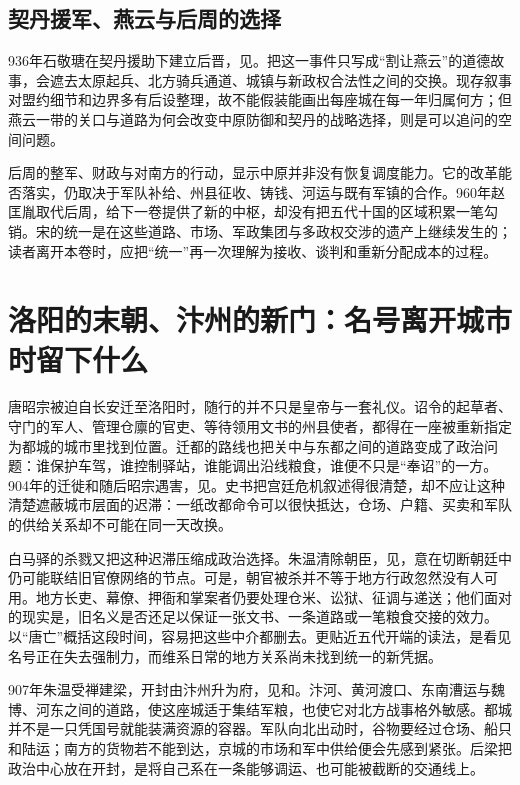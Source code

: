 \subsection{契丹援军、燕云与后周的选择}
936年石敬瑭在契丹援助下建立后晋，见。把这一事件只写成“割让燕云”的道德故事，会遮去太原起兵、北方骑兵通道、城镇与新政权合法性之间的交换。现存叙事对盟约细节和边界多有后设整理，故不能假装能画出每座城在每一年归属何方；但燕云一带的关口与道路为何会改变中原防御和契丹的战略选择，则是可以追问的空间问题。

后周的整军、财政与对南方的行动，显示中原并非没有恢复调度能力。它的改革能否落实，仍取决于军队补给、州县征收、铸钱、河运与既有军镇的合作。960年赵匡胤取代后周，给下一卷提供了新的中枢，却没有把五代十国的区域积累一笔勾销。宋的统一是在这些道路、市场、军政集团与多政权交涉的遗产上继续发生的；读者离开本卷时，应把“统一”再一次理解为接收、谈判和重新分配成本的过程。

\section{洛阳的末朝、汴州的新门：名号离开城市时留下什么}

唐昭宗被迫自长安迁至洛阳时，随行的并不只是皇帝与一套礼仪。诏令的起草者、守门的军人、管理仓廪的官吏、等待领用文书的州县使者，都得在一座被重新指定为都城的城市里找到位置。迁都的路线也把关中与东都之间的道路变成了政治问题：谁保护车驾，谁控制驿站，谁能调出沿线粮食，谁便不只是“奉诏”的一方。904年的迁徙和随后昭宗遇害，见。史书把宫廷危机叙述得很清楚，却不应让这种清楚遮蔽城市层面的迟滞：一纸改都命令可以很快抵达，仓场、户籍、买卖和军队的供给关系却不可能在同一天改换。

白马驿的杀戮又把这种迟滞压缩成政治选择。朱温清除朝臣，见，意在切断朝廷中仍可能联结旧官僚网络的节点。可是，朝官被杀并不等于地方行政忽然没有人可用。地方长吏、幕僚、押衙和掌案者仍要处理仓米、讼狱、征调与递送；他们面对的现实是，旧名义是否还足以保证一张文书、一条道路或一笔粮食交接的效力。以“唐亡”概括这段时间，容易把这些中介都删去。更贴近五代开端的读法，是看见名号正在失去强制力，而维系日常的地方关系尚未找到统一的新凭据。

907年朱温受禅建梁，开封由汴州升为府，见和。汴河、黄河渡口、东南漕运与魏博、河东之间的道路，使这座城适于集结军粮，也使它对北方战事格外敏感。都城并不是一只凭国号就能装满资源的容器。军队向北出动时，谷物要经过仓场、船只和陆运；南方的货物若不能到达，京城的市场和军中供给便会先感到紧张。后梁把政治中心放在开封，是将自己系在一条能够调运、也可能被截断的交通线上。

